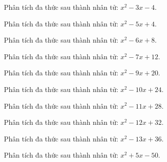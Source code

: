 \begin{bt}
	Phân tích đa thức sau thành nhân tử: $x^2 - 3 x - 4$.
\end{bt}
\begin{bt}
	Phân tích đa thức sau thành nhân tử: $x^2 - 5 x + 4$.
\end{bt}
\begin{bt}
	Phân tích đa thức sau thành nhân tử: $x^2 - 6 x + 8$.
\end{bt}
\begin{bt}
	Phân tích đa thức sau thành nhân tử: $x^2 - 7 x + 12$.
\end{bt}
\begin{bt}
	Phân tích đa thức sau thành nhân tử: $x^2 - 9 x + 20$.
\end{bt}
\begin{bt}
	Phân tích đa thức sau thành nhân tử: $x^2 - 10 x + 24$.
\end{bt}
\begin{bt}
	Phân tích đa thức sau thành nhân tử: $x^2 - 11 x + 28$.
\end{bt}
\begin{bt}
	Phân tích đa thức sau thành nhân tử: $x^2 - 12 x + 32$.
\end{bt}
\begin{bt}
	Phân tích đa thức sau thành nhân tử: $x^2 - 13 x + 36$.
\end{bt}
\begin{bt}
	Phân tích đa thức sau thành nhân tử: $x^2 + 5 x - 50$.
\end{bt}
